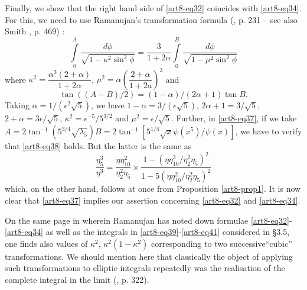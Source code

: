 Finally, we show that the right hand side of \eqref{art8-eq32} coincides with \eqref{art8-eq34}. For this, we need to use Ramanujan's transformation formula (\cite{art8-key10}, p. 231 -- see also Smith \cite{art8-key12}, p. 469) :
\begin{equation}
\int\limits^{A}_{0}\dfrac{d\phi}{\sqrt{1-\kappa^{2}\sin^{2}\phi}}=\dfrac{3}{1+2\alpha}\int\limits^{B}_{0}\dfrac{d\phi}{\sqrt{1-\mu^{2}\sin^{2}\phi}}\label{art8-eq37}
\end{equation}
where $\kappa^{2}=\dfrac{\alpha^{3}(2+\alpha)}{1+2\alpha}$, $\mu^{2}=\alpha\left(\dfrac{2+\alpha}{1+2a}\right)^{3}$ and 
\begin{equation}
\tan ((A-B)/2)=(1-\alpha)/(2\alpha+1)\tan B.\label{art8-eq38}
\end{equation}
Taking $\alpha=1/(\epsilon^{2}\sqrt{5})$, we have $1-\alpha=3/(\epsilon\sqrt{5})$, $2\alpha+1=3/\sqrt{5}$, $2+\alpha=3\epsilon/\sqrt{5}$, $\kappa^{2}=\epsilon^{-5}/5^{3/2}$ and $\mu^{2}=\epsilon/\sqrt{5}$. Further, in \eqref{art8-eq37}, if we take $A=2\tan^{-1}(5^{3/4}\sqrt{\lambda_{5}})B=2\tan^{-1}[5^{1/4}\sqrt{x}\psi(x^{5})/\psi(x)]$, we have to verify that \eqref{art8-eq38} holds. But the latter is the same as
$$
\frac{\eta^{3}_{5}}{\eta^{3}}=\dfrac{\eta\eta^{2}_{10}}{\eta^{2}_{2}\eta_{5}}\times \frac{1-(\eta\eta^{2}_{10}/\eta^{2}_{2}\eta_{5})^{2}}{1-5(\eta\eta^{2}_{10}/\eta^{2}_{2}\eta_{5})^{2}}
$$
which, on the other hand, follows at once from Proposition \ref{art8-prop1}. It is now clear that \eqref{art8-eq37} implies our assertion concerning \eqref{art8-eq32} and \eqref{art8-eq34}.

\begin{remark*}
On the same page in \cite{art8-key11} wherein Ramanujan has noted down formulae \eqref{art8-eq32}-\eqref{art8-eq34} as well as the integrals in \eqref{art8-eq39}-\eqref{art8-eq41} considered in \S3.5, one finds also values of $\kappa^{2}$, $\kappa^{2}(1-\kappa^{2})$ corresponding to two successive\pageoriginale ``cubic'' transformations. We should mention here that classically the object of applying such transformations to elliptic integrals repeatedly was the realisation of the complete integral in the limit (\cite{art8-key4}, p. 322).
\end{remark*}

